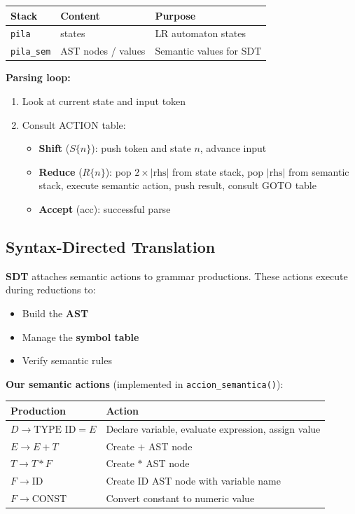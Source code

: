 \documentclass[letterpaper,12pt,oneside]{article}
\begin{document}
	\begin{table}[h]
		\centering
		\begin{tabular}{|l|l|l|}
			\hline
			\textbf{Stack} & \textbf{Content} & \textbf{Purpose} \\
			\hline
			\texttt{pila} & states & LR automaton states \\
			\texttt{pila\_sem} & AST nodes / values & Semantic values for SDT \\
			\hline
		\end{tabular}
	\end{table}
	
	\textbf{Parsing loop:}
	\begin{enumerate}
		\item Look at current state and input token
		\item Consult ACTION table:
		\begin{itemize}
			\item \textbf{Shift} ($S\{n\}$): push token and state $n$, advance input
			\item \textbf{Reduce} ($R\{n\}$): pop $2 \times |\text{rhs}|$ from state stack, pop $|\text{rhs}|$ from semantic stack, execute semantic action, push result, consult GOTO table
			\item \textbf{Accept} (acc): successful parse
		\end{itemize}
	\end{enumerate}
	
	\subsection{Syntax-Directed Translation}
	
	\textbf{SDT} attaches semantic actions to grammar productions. These actions execute during reductions to:
	\begin{itemize}
		\item Build the \textbf{AST}
		\item Manage the \textbf{symbol table}
		\item Verify semantic rules
	\end{itemize}
	
	\textbf{Our semantic actions} (implemented in \texttt{accion\_semantica()}):
	
	\begin{table}[h]
		\centering
		\begin{tabular}{|l|l|}
			\hline
			\textbf{Production} & \textbf{Action} \\
			\hline
			$D \rightarrow \text{TYPE ID} = E$ & Declare variable, evaluate expression, assign value \\
			$E \rightarrow E + T$ & Create $+$ AST node \\
			$T \rightarrow T * F$ & Create $*$ AST node \\
			$F \rightarrow \text{ID}$ & Create ID AST node with variable name \\
			$F \rightarrow \text{CONST}$ & Convert constant to numeric value \\
			\hline
		\end{tabular}
	\end{table}
	
\end{document}
